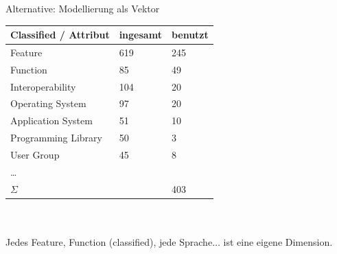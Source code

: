 \documentclass[aspectratio=1610,handout]{beamer}
\begin{document}

\begin{frame}{Alternative: Modellierung als Vektor}
\begin{tabular}{lll}
\toprule
Classified / Attribut		&ingesamt	&benutzt\\
\midrule
Feature						&619		&245\\
Function					&85			&49\\	
Interoperability			&104		&20\\
Operating System			&97			&20\\
Application System			&51			&10\\
Programming Library			&50			&3\\
User Group					&45			&8\\
\ldots\\
\midrule
$\Sigma$					&			&403\\
\bottomrule
\end{tabular}
~\\~\\
Jedes Feature, Function (classified), jede Sprache$\ldots$ ist eine eigene Dimension.\\
\end{frame}
\end{document}
